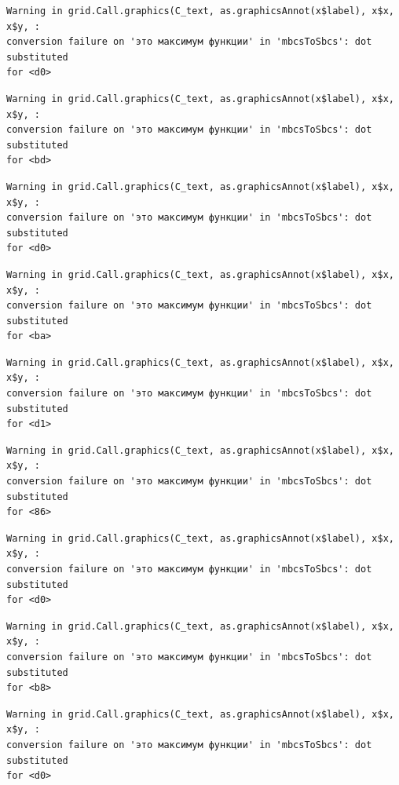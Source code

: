\documentclass[
  letterpaper,
]{scrbook}
\theoremstyle{definition}
\theoremstyle{remark}
\begin{document}
\begin{verbatim}
Warning in grid.Call.graphics(C_text, as.graphicsAnnot(x$label), x$x, x$y, :
conversion failure on 'это максимум функции' in 'mbcsToSbcs': dot substituted
for <d0>
\end{verbatim}

\begin{verbatim}
Warning in grid.Call.graphics(C_text, as.graphicsAnnot(x$label), x$x, x$y, :
conversion failure on 'это максимум функции' in 'mbcsToSbcs': dot substituted
for <bd>
\end{verbatim}

\begin{verbatim}
Warning in grid.Call.graphics(C_text, as.graphicsAnnot(x$label), x$x, x$y, :
conversion failure on 'это максимум функции' in 'mbcsToSbcs': dot substituted
for <d0>
\end{verbatim}

\begin{verbatim}
Warning in grid.Call.graphics(C_text, as.graphicsAnnot(x$label), x$x, x$y, :
conversion failure on 'это максимум функции' in 'mbcsToSbcs': dot substituted
for <ba>
\end{verbatim}

\begin{verbatim}
Warning in grid.Call.graphics(C_text, as.graphicsAnnot(x$label), x$x, x$y, :
conversion failure on 'это максимум функции' in 'mbcsToSbcs': dot substituted
for <d1>
\end{verbatim}

\begin{verbatim}
Warning in grid.Call.graphics(C_text, as.graphicsAnnot(x$label), x$x, x$y, :
conversion failure on 'это максимум функции' in 'mbcsToSbcs': dot substituted
for <86>
\end{verbatim}

\begin{verbatim}
Warning in grid.Call.graphics(C_text, as.graphicsAnnot(x$label), x$x, x$y, :
conversion failure on 'это максимум функции' in 'mbcsToSbcs': dot substituted
for <d0>
\end{verbatim}

\begin{verbatim}
Warning in grid.Call.graphics(C_text, as.graphicsAnnot(x$label), x$x, x$y, :
conversion failure on 'это максимум функции' in 'mbcsToSbcs': dot substituted
for <b8>
\end{verbatim}

\begin{verbatim}
Warning in grid.Call.graphics(C_text, as.graphicsAnnot(x$label), x$x, x$y, :
conversion failure on 'это максимум функции' in 'mbcsToSbcs': dot substituted
for <d0>
\end{verbatim}
\end{document}
